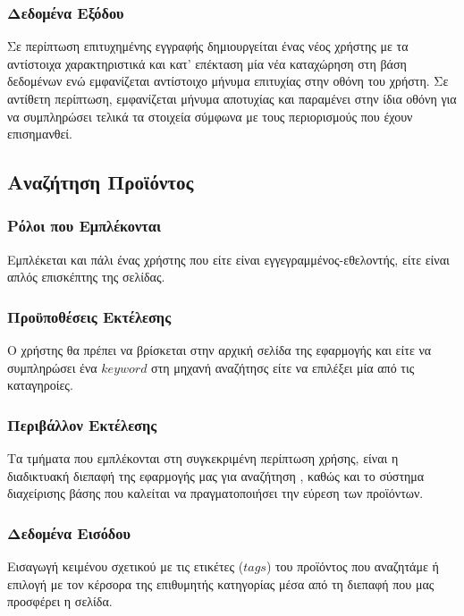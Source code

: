 \documentclass[12pt]{article}
\begin{document}
\subsubsection{Δεδομένα Εξόδου}

Σε περίπτωση επιτυχημένης εγγραφής δημιουργείται ένας νέος χρήστης με τα αντίστοιχα χαρακτηριστικά και κατ' επέκταση μία νέα καταχώρηση στη βάση δεδομένων ενώ εμφανίζεται αντίστοιχο μήνυμα επιτυχίας στην οθόνη του χρήστη. Σε αντίθετη περίπτωση, εμφανίζεται μήνυμα αποτυχίας και παραμένει στην ίδια οθόνη για να συμπληρώσει τελικά τα στοιχεία σύμφωνα με τους περιορισμούς που έχουν επισημανθεί.


\subsection{Αναζήτηση Προϊόντος}

\subsubsection{Ρόλοι που Εμπλέκονται}

Εμπλέκεται και πάλι ένας χρήστης που είτε  είναι εγγεγραμμένος-εθελοντής, είτε είναι απλός επισκέπτης της σελίδας.
\subsubsection{Προϋποθέσεις Εκτέλεσης}

Ο χρήστης θα πρέπει να βρίσκεται στην αρχική σελίδα της εφαρμογής και είτε να συμπληρώσει ένα $keyword$ στη μηχανή αναζήτησς είτε να επιλέξει μία από τις καταγηροίες.

\subsubsection{Περιβάλλον Εκτέλεσης}

Τα τμήματα που εμπλέκονται στη συγκεκριμένη περίπτωση χρήσης, είναι η διαδικτυακή διεπαφή της εφαρμογής μας για αναζήτηση , καθώς και το σύστημα διαχείρισης βάσης που καλείται να πραγματοποιήσει την εύρεση των προϊόντων. 

\subsubsection{Δεδομένα Εισόδου}

Εισαγωγή κειμένου σχετικού με τις ετικέτες ($tags$) του προϊόντος που αναζητάμε ή επιλογή με τον κέρσορα της επιθυμητής κατηγορίας μέσα από τη διεπαφή που μας προσφέρει η σελίδα.
\end{document}
